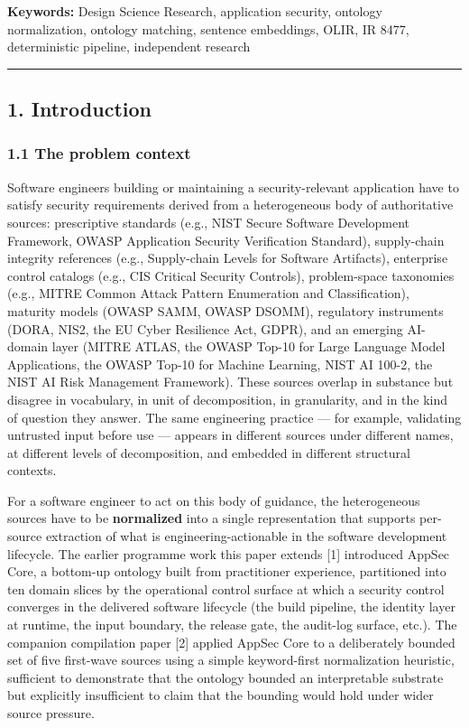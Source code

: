 \documentclass[
]{article}
\begin{document}
\textbf{Keywords:} Design Science Research, application security,
ontology normalization, ontology matching, sentence embeddings, OLIR, IR
8477, deterministic pipeline, independent research

\begin{center}\rule{0.5\linewidth}{0.5pt}\end{center}

\subsection{1. Introduction}\label{introduction}

\subsubsection{1.1 The problem context}\label{the-problem-context}

Software engineers building or maintaining a security-relevant
application have to satisfy security requirements derived from a
heterogeneous body of authoritative sources: prescriptive standards
(e.g., NIST Secure Software Development Framework, OWASP Application
Security Verification Standard), supply-chain integrity references
(e.g., Supply-chain Levels for Software Artifacts), enterprise control
catalogs (e.g., CIS Critical Security Controls), problem-space
taxonomies (e.g., MITRE Common Attack Pattern Enumeration and
Classification), maturity models (OWASP SAMM, OWASP DSOMM), regulatory
instruments (DORA, NIS2, the EU Cyber Resilience Act, GDPR), and an
emerging AI-domain layer (MITRE ATLAS, the OWASP Top-10 for Large
Language Model Applications, the OWASP Top-10 for Machine Learning, NIST
AI 100-2, the NIST AI Risk Management Framework). These sources overlap
in substance but disagree in vocabulary, in unit of decomposition, in
granularity, and in the kind of question they answer. The same
engineering practice --- for example, validating untrusted input before
use --- appears in different sources under different names, at different
levels of decomposition, and embedded in different structural contexts.

For a software engineer to act on this body of guidance, the
heterogeneous sources have to be \textbf{normalized} into a single
representation that supports per-source extraction of what is
engineering-actionable in the software development lifecycle. The
earlier programme work this paper extends {[}1{]} introduced AppSec
Core, a bottom-up ontology built from practitioner experience,
partitioned into ten domain slices by the operational control surface at
which a security control converges in the delivered software lifecycle
(the build pipeline, the identity layer at runtime, the input boundary,
the release gate, the audit-log surface, etc.). The companion
compilation paper {[}2{]} applied AppSec Core to a deliberately bounded
set of five first-wave sources using a simple keyword-first
normalization heuristic, sufficient to demonstrate that the ontology
bounded an interpretable substrate but explicitly insufficient to claim
that the bounding would hold under wider source pressure.
\end{document}
